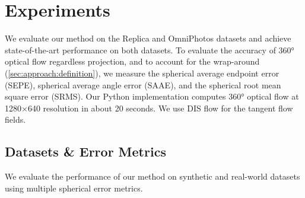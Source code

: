 \section{Experiments}
\label{sec:exp}

We evaluate our method on the Replica \cite{StrauWMCWGEMRVCYBYPYZLCBGMPSBSNGLN2019} and OmniPhotos \cite{BerteYLR2020} datasets and achieve state-of-the-art performance on both datasets.
%
To evaluate the accuracy of 360° optical flow regardless projection, and to account for the wrap-around (\cref{sec:approach:definition}), we measure the spherical average endpoint error (SEPE), spherical average angle error (SAAE), and the spherical root mean square error (SRMS).
%
Our Python implementation computes 360° optical flow at 1280$\times$640 resolution in about 20 seconds.
We use DIS flow \cite{KroegTDV2016} for the tangent flow fields.


\subsection{Datasets \& Error Metrics}

We evaluate the performance of our method on synthetic and real-world datasets using multiple spherical error metrics.


